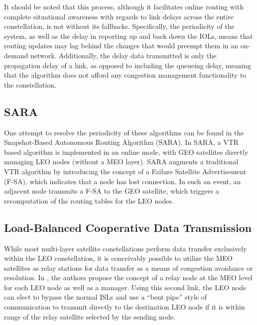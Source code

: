 It should be noted that this process, although it facilitates online routing with complete situational awareness with regards to link delays across the entire constellation, is not without its fallbacks. Specifically, the periodicity of the system, as well as the delay in reporting up and back down the IOLs, means that routing updates may lag behind the changes that would preempt them in an on-demand network. Additionally, the delay data transmitted is only the propagation delay of a link, as opposed to including the queueing delay, meaning that the algorithm does not afford any congestion management functionality to the constellation.

\subsection{SARA}\label{subsec:sara}
One attempt to resolve the periodicity of these algorithms can be found in the Snapshot-Based Autonomous Routing Algorithm (SARA). In SARA, a VTR based algorithm is implemented in an online mode, with GEO satellites directly managing LEO nodes (without a MEO layer). SARA augments a traditional VTR algorithm by introducing the concept of a Failure Satellite Advertisement (F-SA), which indicates that a node has lost connection. In such an event, an adjacent node transmits a F-SA to the GEO satellite, which triggers a recomputation of the routing tables for the LEO nodes.

\subsection{Load-Balanced Cooperative Data Transmission}\label{subsec:loadBalanced}
While most multi-layer satellite constellations perform data transfer exclusively within the LEO constellation, it is conceivably possible to utilize the MEO satellites as relay stations for data transfer as a means of congestion avoidance or resolution. In \cite{li_load-balanced_2018}, the authors propose the concept of a relay node at the MEO level for each LEO node as well as a manager. Using this second link, the LEO node can elect to bypass the normal ISLs and use a ``bent pipe'' style of communication to transmit directly to the destination LEO node if it is within range of the relay satellite selected by the sending node.